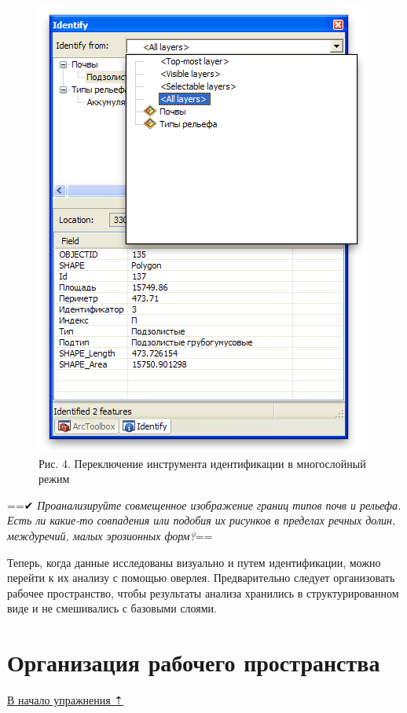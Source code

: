 \documentclass[]{book}
\theoremstyle{definition}
\theoremstyle{definition}
\theoremstyle{definition}
\theoremstyle{remark}
\begin{document}
\begin{enumerate}
  \begin{figure}
  \centering
  \includegraphics{images/Ex10/image7.png}
  \caption{Рис. 4. Переключение инструмента идентификации в многослойный
  режим}
  \end{figure}
\end{enumerate}

==✔︎ \emph{Проанализируйте совмещенное изображение границ типов почв и
рельефа. Есть ли какие-то совпадения или подобия их рисунков в пределах
речных долин, междуречий, малых эрозионных форм?}==

Теперь, когда данные исследованы визуально и путем идентификации, можно
перейти к их анализу с помощью оверлея. Предварительно следует
организовать рабочее пространство, чтобы результаты анализа хранились в
структурированном виде и не смешивались с базовыми слоями.

\hypertarget{overlay-workspace}{%
\section{Организация рабочего пространства}\label{overlay-workspace}}

\protect\hyperlink{overlay}{В начало упражнения ⇡}
\end{document}

